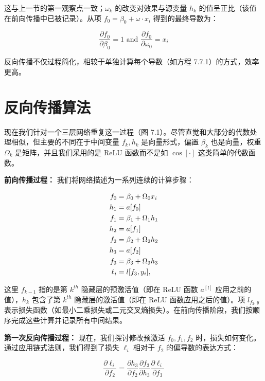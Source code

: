 这与上一节的第一观察点一致；\(\omega_k\) 的改变对效果与源变量 \(h_k\) 的值呈正比（该值在前向传播中已被记录）。从项 \(f_0 = \beta_0 + \omega \cdot x_i\) 得到的最终导数为：

\begin{equation}
\frac{\partial f_0}{\partial \beta_0} = 1 \text{ and } \frac{\partial f_0}{\partial \omega_0} = x_i 
\end{equation}

反向传播不仅过程简化，相较于单独计算每个导数（如方程 7.7.1）的方式，效率更高。

\section{反向传播算法}
现在我们针对一个三层网络重复这一过程（图 7.1）。尽管直觉和大部分的代数处理相似，但主要的不同在于中间变量 \(f_k, h_k\) 是向量形式，偏置 \(\beta_k\) 也是向量，权重 \(\Omega_k\) 是矩阵，并且我们采用的是 ReLU 函数而不是如 \(\cos[\cdot]\) 这类简单的代数函数。

\textbf{前向传播过程：} 我们将网络描述为一系列连续的计算步骤：


\begin{align}
f_0 &= \beta_0 + \Omega_0x_i \notag \\
h_1 &= a[f_0] \notag \\
f_1 &= \beta_1 + \Omega_1h_1 \notag \\
h_2 &= a[f_1] \notag \\
f_2 &= \beta_2 + \Omega_2h_2 \notag \\
h_3 &= a[f_2] \notag \\
f_3 &= \beta_3 + \Omega_3h_3 \notag \\
\ell_i &= l[f_3, y_i], 
\end{align} 


这里 \(f_{k-1}\) 指的是第 \(k^{th}\) 隐藏层的预激活值（即在 ReLU 函数 \(a^{[l]}\) 应用之前的值），\(h_k\) 包含了第 \(k^{th}\) 隐藏层的激活值（即在 ReLU 函数应用之后的值）。项 \(l_{f_3, y}\) 表示损失函数（如最小二乘损失或二元交叉熵损失）。在前向传播阶段，我们按顺序完成这些计算并记录所有中间结果。

\textbf{第一次反向传播过程：} 现在，我们探讨修改预激活 \(f_0, f_1, f_2\) 时，损失如何变化。通过应用链式法则，我们得到了损失 \(\ell_i\) 相对于 \(f_2\) 的偏导数的表达方式：

\begin{equation}
\frac{\partial \ell_i}{\partial f_2} = \frac{\partial h_3}{\partial f_2} \frac{\partial f_3}{\partial h_3} \frac{\partial \ell_i}{\partial f_3} 
\end{equation}



